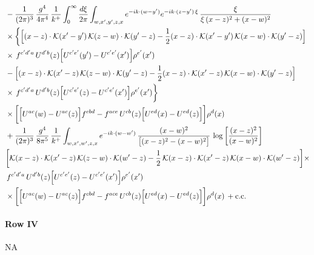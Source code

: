 \documentclass[9pt]{article}
\numberwithin{equation}{section}
\begin{document}
\begin{align}
&-\frac{1}{(2\pi)^{3}}\,\frac{g^{4}}{4\pi^{4}}\,\frac{1}{k^{+}}\int_{0}^{\infty}\frac{d\xi}{2\pi}\int_{w,x',y',z,x}e^{-ik\cdot(w-y')}e^{-ik\cdot(z-y')\,\xi}\,\frac{\xi}{\xi\,(x-z)^{2}+(x-w)^{2}}\notag\\
&\times\bigg\{\Big[(x-z)\cdot\mathcal{K}(x'-y')\,\mathcal{K}(z-w)\cdot\mathcal{K}(y'-z)-\frac{1}{2}(x-z)\cdot\mathcal{K}(x'-y')\,\mathcal{K}(x-w)\cdot\mathcal{K}(y'-z)\Big]\notag\\
&\times\,f^{c'd'a}\,U^{d'b}(z)\Big[U^{c'e'}(y')-U^{c'e'}(x')\Big]\rho^{e'}(x')\notag\\
&-\Big[(x-z)\cdot\mathcal{K}(x'-z)\,\mathcal{K}(z-w)\cdot\mathcal{K}(y'-z)-\frac{1}{2}(x-z)\cdot\mathcal{K}(x'-z)\,\mathcal{K}(x-w)\cdot\mathcal{K}(y'-z)\Big]\notag\\
&\times\,f^{c'd'a}\,U^{d'b}(z)\Big[U^{c'e'}(z)-U^{c'e'}(x')\Big]\rho^{e'}(x')\bigg\}\notag\\
&\times\bigg[\Big[U^{ac}(w)-U^{ac}(z)\Big]f^{cbd}-f^{ace}\,U^{cb}(z)\Big[U^{ed}(x)-U^{ed}(z)\Big]\bigg]\rho^{d}(x)\notag\\
& +\frac{1}{(2\pi)^{3}}\,\frac{g^{4}}{8\pi^{5}}\,\frac{1}{k^{+}}\int_{w,x',w',z,x}e^{-ik\cdot(w-w')}\,\frac{(x-w)^{2}}{\big[(x-z)^{2}-(x-w)^{2}\big]}\,\log\left[\frac{(x-z)^{2}}{(x-w)^{2}}\right]\notag \\ &  \bigg[\mathcal{K}(x-z)\cdot\mathcal{K}(x'-z)\,\mathcal{K}(z-w)\cdot\mathcal{K}(w'-z)-\frac{1}{2}\,\mathcal{K}(x-z)\cdot\mathcal{K}(x'-z)\,\mathcal{K}(x-w)\cdot\mathcal{K}(w'-z)\bigg]   \times\notag \\ & \,f^{c'd'a}\,U^{d'b}(z)\Big[U^{c'e'}(z)-U^{c'e'}(x')\Big]\rho^{e'}(x')\notag\\ &\times\bigg[\Big[U^{ac}(w)-U^{ac}(z)\Big]f^{cbd}-f^{ace}\,U^{cb}(z)\Big[U^{ed}(x)-U^{ed}(z)\Big]\bigg]\rho^{d}(x)\,+{\rm c.c.}
\label{eq:H-III.III-2o}
\end{align}
\paragraph*{Row IV}
\textsc{NA}
\end{document}

